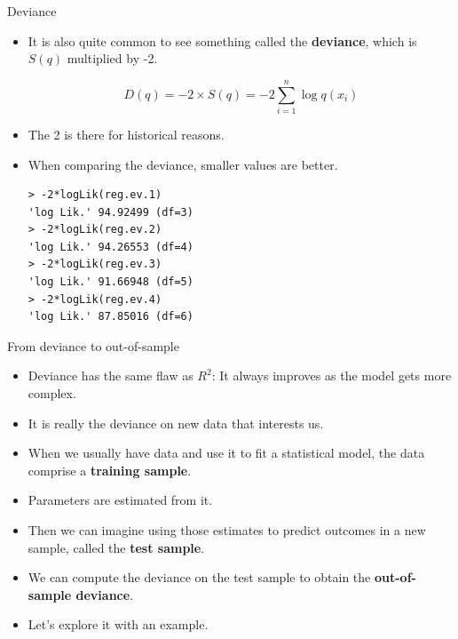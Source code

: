 \documentclass[handout]{beamer}
\begin{document}
\begin{frame}[fragile]{Deviance}
\scriptsize{

\begin{itemize}

\item It is also quite common to see something called the \textbf{deviance}, which is $S(q)$ multiplied by -2.

\begin{equation}
D(q) = -2\times S(q)= -2 \sum_{i=1}^n \log q(x_i)
\end{equation}


\item The 2 is there for historical reasons.

\item When comparing the deviance,  smaller values are better.  

\begin{verbatim}
> -2*logLik(reg.ev.1)
'log Lik.' 94.92499 (df=3)
> -2*logLik(reg.ev.2)
'log Lik.' 94.26553 (df=4)
> -2*logLik(reg.ev.3)
'log Lik.' 91.66948 (df=5)
> -2*logLik(reg.ev.4)
'log Lik.' 87.85016 (df=6) 
\end{verbatim}



\end{itemize}


} 
\end{frame}


\begin{frame}{From deviance to out-of-sample}
\scriptsize{

\begin{itemize}

\item Deviance has the same flaw as $R^2$: It always improves as the model gets more complex.

\item It is really the deviance on new data that interests us.

\item When we usually have data and use it to fit a statistical model, the data comprise a \textbf{training sample}.

\item Parameters are estimated from it.

\item Then we can imagine using those estimates to predict outcomes in a new sample, called the \textbf{test sample}.

\item We can compute the deviance on the test sample to obtain the \textbf{out-of-sample deviance}. 

\item Let's explore it with an example.

\end{itemize}


} 
\end{frame}
\end{document}
